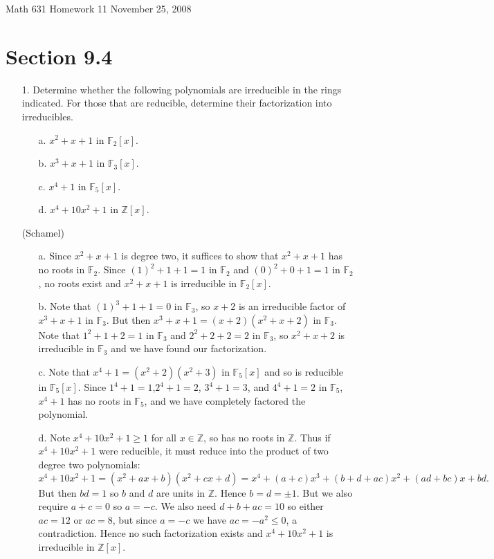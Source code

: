 \documentclass[10pt]{article}
\newcommand{\Z}{\mathbb{Z}}
\newcommand{\F}{\mathbb{F}}
\newcommand\header{{\sc Math 631 \hfill Homework 11 \hfill November 25, 2008}}
\begin{document}
\header

\section*{Section 9.4}

\begin{itemize}

\item[1.] Determine whether the following polynomials are irreducible in the rings indicated.  For those that are reducible, determine their factorization into irreducibles.
\begin{itemize}
\item[a.] $x^2+x+1$ in $\F_2[x]$.
\item[b.] $x^3+x+1$ in $\F_3[x]$.
\item[c.] $x^4+1$ in $\F_5[x]$.
\item[d.] $x^4+10x^2+1$ in $\Z[x]$.
\end{itemize}
(Schamel)
\begin{itemize}
\item[a.] Since $x^2+x+1$ is degree two, it suffices to show that $x^2+x+1$ has no roots in $\F_2$.  Since $(1)^2+1+1 = 1$ in $\F_2$ and $(0)^2+0+1 = 1$ in $\F_2$, no roots exist and $x^2+x+1$ is irreducible in $\F_2[x]$.
\item[b.] Note that $(1)^3+1+1 = 0$ in $\F_3$, so $x+2$ is an irreducible factor of $x^3+x+1$ in $\F_3$.  But then $x^3+x+1 = (x+2)(x^2+x+2)$ in $\F_3$.  Note that $1^2+1+2 = 1$ in $\F_3$ and $2^2+2+2 = 2$ in $\F_3$, so $x^2+x+2$ is irreducible in $\F_3$ and we have found our factorization.
\item[c.] Note that $x^4+1 = (x^2 +2)(x^2+3)$ in $\F_5[x]$ and so is reducible in $\F_5[x]$.  Since $1^4 +1 =1$,$2^4+1 = 2$, $3^4+1=3$, and $4^4+1=2$ in $\F_5$, $x^4+1$ has no roots in $\F_5$, and we have completely factored the polynomial.
\item[d.]  Note $x^4+10x^2+1 \geq 1$ for all $x \in \Z$, so has no roots in $\Z$.  Thus if $x^4+10x^2+1$ were reducible, it must reduce into the product of two degree two polynomials: 
\[  x^4 +10x^2 +1 = (x^2+ax+b)(x^2+cx+d) = x^4 + (a+c)x^3 + (b+d+ac)x^2 + (ad+bc)x+bd.\]
But then $bd = 1$ so $b$ and $d$ are units in $\Z$.  Hence $b=d=\pm 1$.  But we also require $a+c = 0$ so $a=-c$.  We also need $d+b+ac = 10$ so either $ac = 12$ or $ac=8$, but since $a=-c$ we have $ac = -a^2 \leq 0$, a contradiction.  Hence no such factorization exists and $x^4 + 10x^2 + 1$ is irreducible in $\Z[x]$.
\end{itemize}


\end{itemize}
\end{document}
